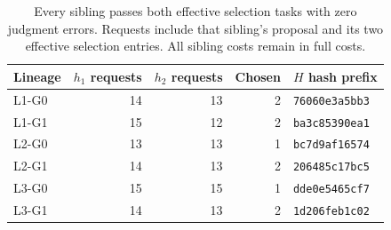 \begin{table}[htbp]
\centering\small
\begin{tabular}{@{}lrrrl@{}}
\toprule
Lineage & $h_1$ requests & $h_2$ requests & Chosen & $H$ hash prefix \\
\midrule
L1-G0 & 14 & 13 & 2 & \texttt{76060e3a5bb3} \\
L1-G1 & 15 & 12 & 2 & \texttt{ba3c85390ea1} \\
L2-G0 & 13 & 13 & 1 & \texttt{bc7d9af16574} \\
L2-G1 & 14 & 13 & 2 & \texttt{206485c17bc5} \\
L3-G0 & 15 & 15 & 1 & \texttt{dde0e5465cf7} \\
L3-G1 & 14 & 13 & 2 & \texttt{1d206feb1c02} \\
\bottomrule
\end{tabular}
\caption{Every sibling passes both effective selection tasks with zero judgment errors. Requests include that sibling's proposal and its two effective selection entries. All sibling costs remain in full costs.}\label{tab:choices}
\end{table}
